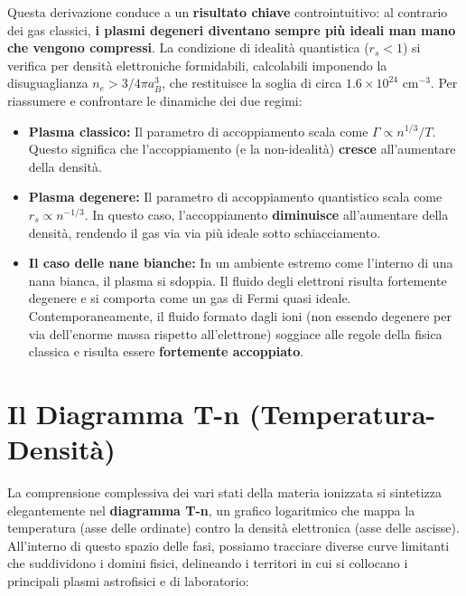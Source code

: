 Questa derivazione conduce a un \textbf{risultato chiave} controintuitivo: al contrario dei gas classici, \textbf{i plasmi degeneri diventano sempre più ideali man mano che vengono compressi}. La condizione di idealità quantistica ($r_s < 1$) si verifica per densità elettroniche formidabili, calcolabili imponendo la disuguaglianza $n_e > 3/4\pi a_B^3$, che restituisce la soglia di circa $1.6 \times 10^{24} \text{ cm}^{-3}$.
Per riassumere e confrontare le dinamiche dei due regimi:
\begin{itemize}
\item \textbf{Plasma classico:} Il parametro di accoppiamento scala come $\Gamma \propto n^{1/3} / T$. Questo significa che l'accoppiamento (e la non-idealità) \textbf{cresce} all'aumentare della densità.
\item \textbf{Plasma degenere:} Il parametro di accoppiamento quantistico scala come $r_s \propto n^{-1/3}$. In questo caso, l'accoppiamento \textbf{diminuisce} all'aumentare della densità, rendendo il gas via via più ideale sotto schiacciamento.
\item \textbf{Il caso delle nane bianche:} In un ambiente estremo come l'interno di una nana bianca, il plasma si sdoppia. Il fluido degli elettroni risulta fortemente degenere e si comporta come un gas di Fermi quasi ideale. Contemporaneamente, il fluido formato dagli ioni (non essendo degenere per via dell'enorme massa rispetto all'elettrone) soggiace alle regole della fisica classica e risulta essere \textbf{fortemente accoppiato}.
\end{itemize}

\section{Il Diagramma T-n (Temperatura-Densità)}

La comprensione complessiva dei vari stati della materia ionizzata si sintetizza elegantemente nel \textbf{diagramma T-n}, un grafico logaritmico che mappa la temperatura (asse delle ordinate) contro la densità elettronica (asse delle ascisse). All'interno di questo spazio delle fasi, possiamo tracciare diverse curve limitanti che suddividono i domini fisici, delineando i territori in cui si collocano i principali plasmi astrofisici e di laboratorio:

